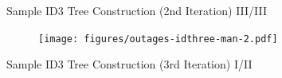 \documentclass[document.tex]{subfiles}
\begin{document}
    \begin{frame}{Sample ID3 Tree Construction (2nd Iteration) III/III}
        \begin{figure}
            \texttt{[image: figures/outages-idthree-man-2.pdf]}
        \end{figure}
    \end{frame}
    
    \begin{frame}{Sample ID3 Tree Construction (3rd Iteration) I/II}
        \begin{columns}
            \begin{column}{0.4\textwidth}
                \begin{table}
                    \caption*{\footnotesize Sample $S$ \normalsize}
                    \vspace*{-2mm}
                \end{table}
                \vspace*{-6mm}
                \begin{table}
                    \caption*{\footnotesize Attribute $A=TEMPERATURE$, Sample $S_H$ \normalsize}
                    \vspace*{-2mm}
\end{table}
\end{column}
\end{columns}
\end{frame}
\end{document}
